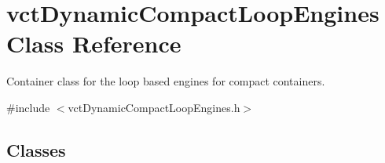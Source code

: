 \hypertarget{classvct_dynamic_compact_loop_engines}{\section{vct\-Dynamic\-Compact\-Loop\-Engines Class Reference}
\label{classvct_dynamic_compact_loop_engines}
}


Container class for the loop based engines for compact containers.  




{\ttfamily \#include $<$vct\-Dynamic\-Compact\-Loop\-Engines.\-h$>$}

\subsection*{Classes}
